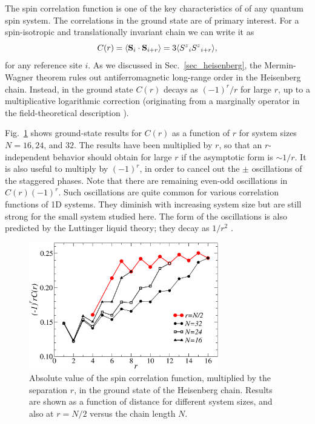 \documentclass[draft,numberedheadings]{aipproc}
\begin{document}
The spin correlation function is one of the key characteristics of of any quantum spin system. The correlations in the ground state are of primary interest.
For a spin-isotropic and translationally invariant chain we can write it as
\begin{equation}
C(r) = \langle {\bf S}_i \cdot {\bf S}_{i+r}\rangle = 3\langle {S^z}_i{S^z}_{i+r}\rangle,
\label{cpincorr}
\end{equation}
for any reference site $i$. As we discussed in Sec.~\ref{sec_heisenberg}, the Mermin-Wagner theorem rules out antiferromagnetic long-range order in the Heisenberg 
chain. Instead, in the ground state $C(r)$ decays as $(-1)^r/r$ for large $r$, up to a multiplicative logarithmic correction (originating from a marginally 
operator in the field-theoretical description \cite{affleck2,singh1,giamarchi}).

Fig.~\ref{cor} shows ground-state results for $C(r)$ as a function of $r$ for system sizes $N=16,24$, and $32$. The results have been multiplied by $r$, so 
that an $r$-independent behavior should obtain for large $r$ if the asymptotic form is $\sim 1/r$. It is also useful to multiply by $(-1)^r$, in order to cancel out
the $\pm$ oscillations of the staggered phases. Note that there are remaining even-odd oscillations in $C(r)(-1)^r$. Such oscillations are quite 
common for various correlation functions of 1D systems. They diminish with increasing system size but are still strong for the small system studied 
here. The form of the oscillations is also predicted by the Luttinger liquid theory; they decay as $1/r^2$ \cite{voit}.

\begin{figure}
\includegraphics[width=8.25cm, clip]{cor.eps}
\caption{Absolute value of the spin correlation function, multiplied by the separation $r$, in the ground state of the Heisenberg chain.
Results are shown as a function of distance for different system sizes, and also at $r=N/2$ versus the chain length $N$.}
\label{cor}
\end{figure}
\end{document}
